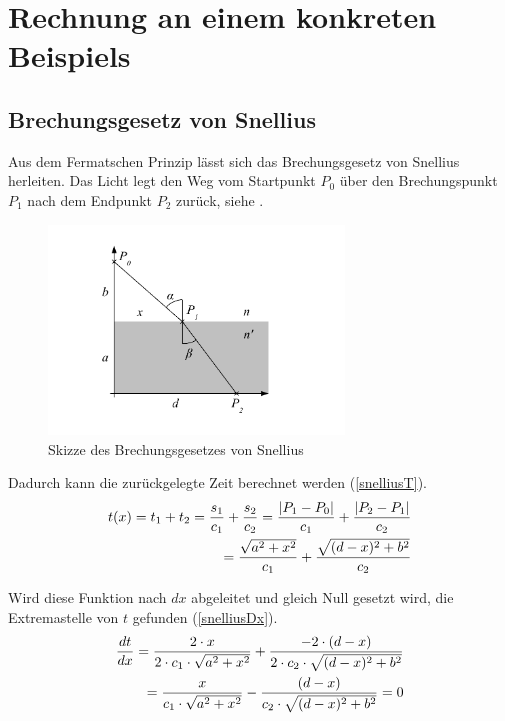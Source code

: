 \section{Rechnung an einem konkreten Beispiels}

\subsection{Brechungsgesetz von Snellius \label{brechungsgesetz}}
\cite{Wikipedia} Aus dem Fermatschen Prinzip lässt sich das Brechungsgesetz von Snellius herleiten.
Das Licht legt den Weg vom Startpunkt $P_0$ über den Brechungspunkt $P_1$ 
nach dem Endpunkt $P_2$ zurück, siehe .
\begin{figure}[H]
\begin{center}
	\includegraphics[width=0.7\textwidth]{./picture/Brechung.pdf}
	\caption{Skizze des Brechungsgesetzes von Snellius}
	\label{Ab:brechung}
\end{center}
\end{figure}

Dadurch kann die zurückgelegte Zeit berechnet werden (\eqref{snelliusT}).
\begin{align}
t(x) = t_1 + t_2 = \frac{s_1}{c_1} + \frac{s_2}{c_2} = \frac{|P_1 - P_0|}{c_1} + \frac{|P_2 - P_1|}{c_2} \notag \\
= \frac{\sqrt{a^2 + x^2}}{c_1} + \frac{\sqrt{(d-x)^2 + b^2}}{c_2} \label{snelliusT}
\end{align}

Wird diese Funktion nach $dx$ abgeleitet und gleich Null gesetzt wird, die Extremastelle von $t$ gefunden (\eqref{snelliusDx}).
\begin{align}
	\frac{dt}{dx} = \frac{2 \cdot x}{2 \cdot c_1 \cdot \sqrt{a^2 + x^2}} + \frac{-2 \cdot (d-x)}{2 \cdot c_2 \cdot \sqrt{(d-x)^2 + b^2}} \notag \\
	= \frac{x}{c_1 \cdot \sqrt{a^2 + x^2}} - \frac{(d-x)}{c_2 \cdot \sqrt{(d-x)^2 + b^2}} = 0 
	\label{snelliusDx}
\end{align}

